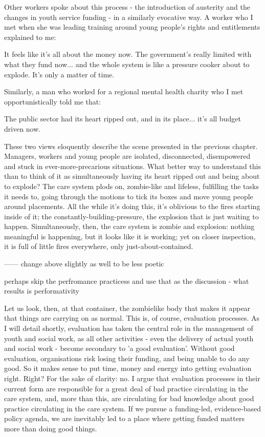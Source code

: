 Other workers spoke about this process - the introduction of austerity and the changes in youth service funding - in a similarly evocative way. A worker who I met when she was leading training around young people's rights and entitlements explained to me:

It feels like it's all about the money now. The government's really limited with what they fund now... and the whole system is like a pressure cooker about to explode. It's only a matter of time.

Similarly, a man who worked for a regional mental health charity who I met opportunistically told me that:

The public sector had its heart ripped out, and in its place... it's all budget driven now.

These two views eloquently describe the scene presented in the previous chapter. Managers, workers and young people are isolated, disconnected, disempowered and stuck in ever-more-precarious situations. What better way to understand this than to think of it as simultaneously having its heart ripped out and being about to explode? The care system plods on, zombie-like and lifeless, fulfilling the tasks it needs to,  going through the motions to tick its boxes and move young people around placements. All the while it's doing this, it's oblivious to the fires starting inside of it; the constantly-building-pressure, the explosion that is just waiting to happen. Simultaneously, then, the care system is zombie and explosion: nothing meaningful is happening, but it looks like it is working; yet on closer inspection, it is full of little fires everywhere, only just-about-contained.


------
change above slightly as well to be less poetic 

perhaps skip the perfromance practicess and use that as the discussion - what results is performativity 

Let us look, then, at that container, the zombielike body that makes it appear that things are carrying on as normal. This is, of course, evaluation processes. As I will detail shortly, evaluation has taken the central role in the management of youth and social work, as all other activities - even the delivery of actual youth and social work - become secondary to 'a good evaluation'. Without good evaluation, organisations risk losing their funding, and being unable to do any good. So it makes sense to put time, money and energy into getting evaluation right. Right? For the sake of clarity: no. I argue that evaluation processes in their current form are responsible for a great deal of bad practice circulating in the care system, and, more than this, are circulating for bad knowledge about good practice circulating in the care system. If we pursue a funding-led, evidence-based policy agenda, we are inevitably led to a place where getting funded matters more than doing good things.

